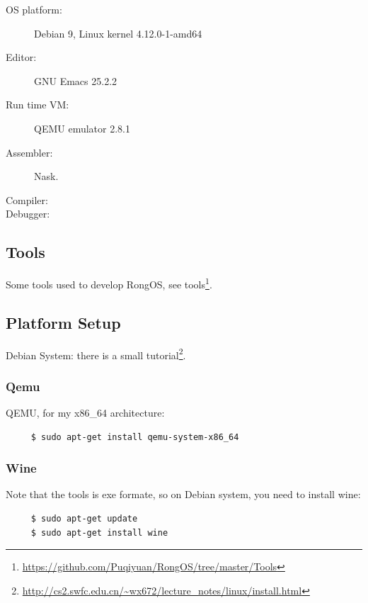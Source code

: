 \documentclass{swfcthesis}
\begin{document}
\begin{description}
\item[OS platform:] Debian 9, Linux kernel 4.12.0-1-amd64
\item[Editor:] GNU Emacs 25.2.2
\item[Run time VM:] QEMU emulator 2.8.1
\item[Assembler:]Nask.
\item[Compiler:] 
\item[Debugger:] 
\end{description}

\subsection{Tools}
\label{sec:tools}

Some tools used to develop RongOS, see
tools\footnote{\url{https://github.com/Puqiyuan/RongOS/tree/master/Tools}}.

\subsection{Platform Setup}
\label{sec:install}

Debian System: there is a small
tutorial\footnote{\url{http://cs2.swfc.edu.cn/~wx672/lecture_notes/linux/install.html}}. 

\subsubsection{Qemu}
\label{sec:qemu}


QEMU, for my x86\_64 architecture: 
\begin{verbatim}
     $ sudo apt-get install qemu-system-x86_64
\end{verbatim}

\subsubsection{Wine}
\label{sec:wine}


Note that the tools is exe formate, so on Debian system, you need to install wine:
\begin{verbatim}
     $ sudo apt-get update
     $ sudo apt-get install wine
\end{verbatim}
\end{document}
